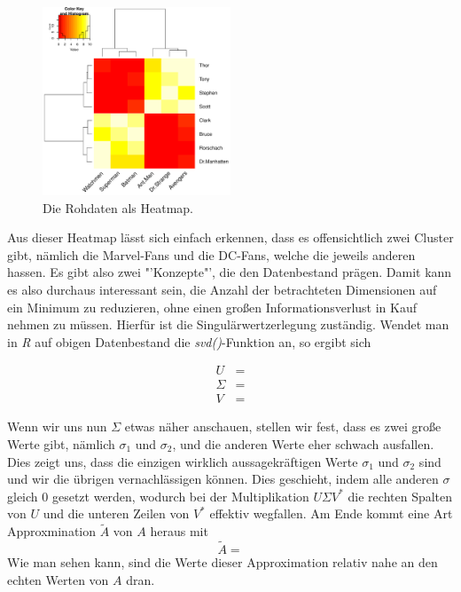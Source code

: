 \begin{figure}[!th]
	\center
	\includegraphics[width=0.5\textwidth]{Figures/original_data}
	\caption{Die Rohdaten als Heatmap.}
	\label{fig:original_data}
\end{figure}

Aus dieser Heatmap lässt sich einfach erkennen, dass es offensichtlich zwei
Cluster gibt, nämlich die Marvel-Fans und die DC-Fans, welche die jeweils anderen
hassen. Es gibt also zwei "'Konzepte"', die den Datenbestand prägen. Damit kann
es also durchaus interessant sein, die Anzahl der betrachteten Dimensionen auf ein
Minimum zu reduzieren, ohne einen großen Informationsverlust in Kauf nehmen zu müssen.
Hierfür ist die Singulärwertzerlegung zuständig. Wendet man in \textit{R} auf
obigen Datenbestand die \textit{svd()}-Funktion an, so ergibt sich

\begin{align*}
	U &= \\
	\Sigma &= \\
	V &= 
\end{align*}

Wenn wir uns nun \(\Sigma\) etwas näher anschauen, stellen wir fest, dass es
zwei große Werte gibt, nämlich \(\sigma_1\) und \(\sigma_2\), und die anderen
Werte eher schwach ausfallen. Dies zeigt uns, dass die einzigen wirklich aussagekräftigen
Werte \(\sigma_1\) und \(\sigma_2\) sind und wir die übrigen vernachlässigen
können. Dies geschieht, indem alle anderen \(\sigma\) gleich \(0\) gesetzt werden,
wodurch bei der Multiplikation \(U\Sigma V^*\) die rechten Spalten von \(U\) und die
unteren Zeilen von \(V^*\) effektiv wegfallen.
Am Ende kommt eine Art Approxmination \(\tilde{A}\) von \(A\) heraus mit
\[
	\tilde{A} = 
\]
Wie man sehen kann, sind die Werte dieser Approximation relativ nahe an den
echten Werten von \(A\) dran.


